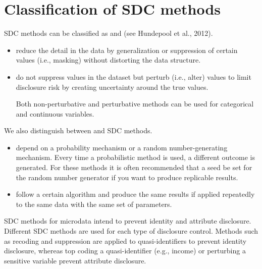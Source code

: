 \documentclass[letterpaper,10pt,english]{sphinxmanual}
\begin{document}
\section{Classification of SDC methods}
\label{\detokenize{anon_methods:classification-of-sdc-methods}}
SDC methods can be classified as  and
 (see Hundepool et al., 2012).
\begin{itemize}
\item {} 
 reduce the detail in the data by
generalization or suppression of certain values (i.e., masking)
without distorting the data structure.

\item {} 
 do not suppress values in the dataset but
perturb (i.e., alter) values to limit disclosure risk by creating
uncertainty around the true values.

Both non-perturbative and perturbative methods can be used for
categorical and continuous variables.

\end{itemize}

We also distinguish between  and  SDC
methods.
\begin{itemize}
\item {} 
 depend on a probability mechanism or a
random number-generating mechanism. Every time a probabilistic method
is used, a different outcome is generated. For these methods it is
often recommended that a seed be set for the random number generator
if you want to produce replicable results.

\item {} 
 follow a certain algorithm and produce the
same results if applied repeatedly to the same data with the same set
of parameters.

\end{itemize}

SDC methods for microdata intend to prevent identity and attribute
disclosure. Different SDC methods are used for each type of disclosure
control. Methods such as recoding and suppression are applied to
quasi-identifiers to prevent identity disclosure, whereas top coding a
quasi-identifier (e.g., income) or perturbing a sensitive variable
prevent attribute disclosure.
\end{document}
